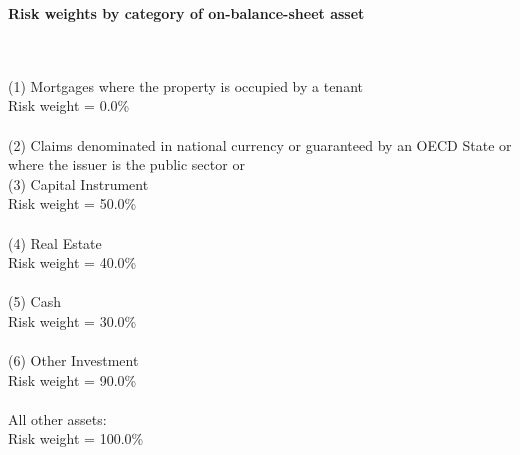 \documentclass{article}
\begin{document}
\setlength{\parindent}{0em}
\begin{center}{\bf Risk weights by category of on-balance-sheet asset}\end{center}
~\\
~\\

(1) Mortgages where the property is occupied by a tenant \\
Risk weight = 0.0\%\\

~\\
(2) Claims denominated in national currency or guaranteed by an OECD State or where the issuer is the public sector or \\
(3) Capital Instrument \\
Risk weight = 50.0\%\\

~\\
(4) Real Estate\\
Risk weight = 40.0\%\\

~\\
(5) Cash \\
Risk weight = 30.0\%\\

~\\
(6) Other Investment\\
Risk weight = 90.0\%\\

~\\
All other assets:\\
Risk weight = 100.0\%\\

~\\
\end{document}
